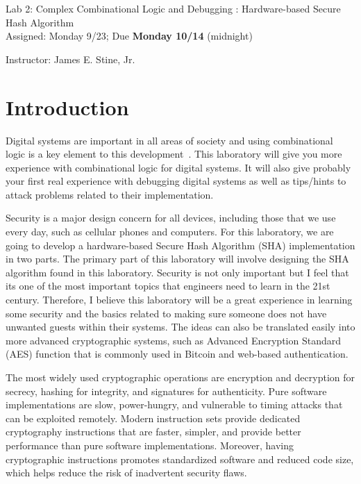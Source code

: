 \documentclass{article}
\newcommand{\myassignment}{Lab 2: Complex Combinational Logic and Debugging : Hardware-based Secure Hash Algorithm}
\newcommand{\myduedate}{Assigned: Monday 9/23; Due \textbf{Monday 10/14} (midnight)}
\newcommand{\myinstructor}{Instructor: James E. Stine, Jr.}
\begin{document}
\begin{center}
  {\huge \myassignment} \\
  {\large \myduedate} \\
  \begin{flushright}
  \myinstructor \\
  \end{flushright}
\end{center}

\section{Introduction}

Digital systems are important in all areas of society and using
combinational logic is a key element to this
development~\cite{ddca-riscv}.  This
laboratory will give you more experience with combinational logic
for digital systems.  It will also give probably your first real
experience with debugging digital systems as well as tips/hints to
attack problems related to their implementation.

Security is a major design concern for all devices, including those
that we
use every day, such as cellular phones and computers.
For this laboratory, we are going to develop a hardware-based Secure
Hash Algorithm (SHA)
implementation
in two parts.  The primary part of this laboratory will involve designing the 
SHA algorithm found in this laboratory.
Security is not only important but I feel that its one of the most important
topics that engineers
need to learn in the 21st century.  Therefore, I
believe this laboratory will be a great experience in learning some
security and the basics related to making sure someone does not have
unwanted guests within their systems.  The ideas can also be
translated easily into more advanced cryptographic systems, such as
Advanced Encryption Standard (AES) function that is
commonly used in Bitcoin and web-based authentication.

The most widely used cryptographic operations are encryption and
decryption for secrecy, hashing for integrity, and signatures for
authenticity. Pure software implementations are slow, power-hungry,
and vulnerable to timing attacks that can be exploited
remotely. Modern instruction sets provide dedicated cryptography
instructions that are faster, simpler, and provide better performance
than pure software implementations. Moreover, having cryptographic
instructions promotes standardized software and reduced code size,
which helps reduce the risk of inadvertent security flaws. 
\end{document}
